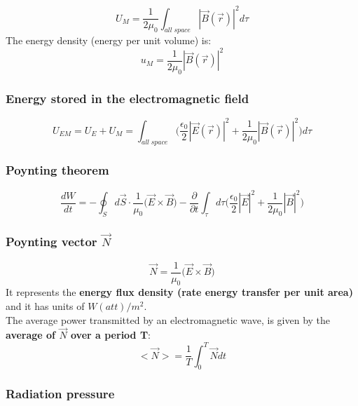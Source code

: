 \documentclass[english,11pt]{article}
\begin{document}
\begin{equation*}
   U_{M} = \frac{1}{2\mu_{0}} \int_{all\;space} |\vec{B}(\vec{r})|^2  d\tau
\end{equation*}
The energy density (energy per unit volume) is:
\begin{equation*}
  u_{M} = \frac{1}{2\mu_{0}} |\vec{B}(\vec{r})|^2
\end{equation*}


\subsubsection*{\bf Energy stored in the electromagnetic field}

\begin{equation*}
   U_{EM} = U_{E} + U_{M} = \int_{all\;space} \Big(
     \frac{\epsilon_0}{2} |\vec{E}(\vec{r})|^2 + \frac{1}{2\mu_{0}} |\vec{B}(\vec{r})|^2
     \Big) d\tau
\end{equation*}


\subsubsection*{\bf Poynting theorem}

\begin{equation*}
  \frac{dW}{dt} =
     - \oint_{S} d\vec{S} \cdot \frac{1}{\mu_0} \Big(\vec{E} \times \vec{B} \Big)
     - \frac{\partial}{\partial t} \int_{\tau} d\tau  \Big( \frac{\epsilon_0}{2} |\vec{E}|^2 + \frac{1}{2\mu_0} |\vec{B}|^2 \Big)
\end{equation*}


\subsubsection*{\bf Poynting vector $\vec{N}$}

\begin{equation*}
  \vec{N} = \frac{1}{\mu_0} \Big( \vec{E} \times \vec{B} \Big)
\end{equation*}
It represents the {\bf energy flux density (rate energy transfer per unit area)} and it has units of $W(att)/m^2$.\\

The average power transmitted by an electromagnetic wave, is given by
the {\bf average of $\vec{N}$ over a period T}:
\begin{equation*}
  <\vec{N}> = \frac{1}{T} \int_{0}^{T} \vec{N} dt
\end{equation*}


\subsubsection*{\bf Radiation pressure}
\end{document}
